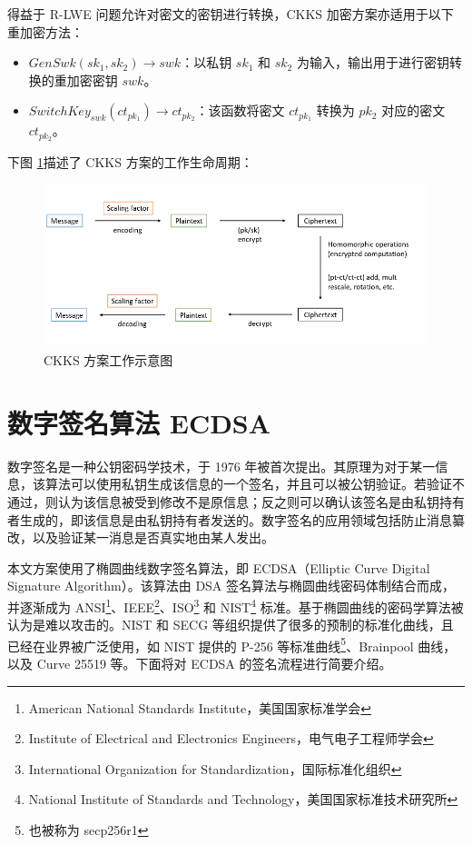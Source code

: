 得益于 R-LWE 问题允许对密文的密钥进行转换\cite{brakerski2014leveled}，CKKS 加密方案亦适用于以下重加密方法：

\begin{itemize}
    \item $GenSwk(sk_1, sk_2) \rightarrow swk$：以私钥 $sk_1$ 和 $sk_2$ 为输入，输出用于进行密钥转换的重加密密钥 $swk$。
    \item $SwitchKey_{swk}(ct_{pk_1}) \rightarrow ct_{pk_2}$：该函数将密文 $ct_{pk_1}$ 转换为 $pk_2$ 对应的密文 $ct_{pk_2}$。
\end{itemize}

下图\cite{ckksIntroduct} \ref*{Fig:CKKS}描述了 CKKS 方案的工作生命周期：

\begin{figure}[ht]
    \centering
    \includegraphics[width=\linewidth]{./Figures/CKKS_Diagram.png}
    \caption{CKKS 方案工作示意图}\label{Fig:CKKS}
\end{figure}

\section{数字签名算法 ECDSA} \label{sec:ecdsa}

数字签名是一种公钥密码学技术，于 1976 年被首次提出\cite{1055638}。其原理为对于某一信息，该算法可以使用私钥生成该信息的一个签名，并且可以被公钥验证。若验证不通过，则认为该信息被受到修改不是原信息；反之则可以确认该签名是由私钥持有者生成的，即该信息是由私钥持有者发送的。数字签名的应用领域包括防止消息纂改，以及验证某一消息是否真实地由某人发出。

本文方案使用了椭圆曲线数字签名算法，即 ECDSA（Elliptic Curve Digital Signature Algorithm）。该算法由 DSA 签名算法与椭圆曲线密码体制结合而成，并逐渐成为 ANSI\footnote{American National Standards Institute，美国国家标准学会}、IEEE\footnote{Institute of Electrical and Electronics Engineers，电气电子工程师学会}、ISO\footnote{International Organization for Standardization，国际标准化组织} 和 NIST\footnote{National Institute of Standards and Technology，美国国家标准技术研究所} 标准\cite{ecdsa_blockchain}。基于椭圆曲线的密码学算法被认为是难以攻击的。NIST 和 SECG 等组织提供了很多的预制的标准化曲线，且已经在业界被广泛使用，如 NIST 提供的 P-256 等标准曲线\footnote{也被称为 secp256r1}、Brainpool 曲线，以及 Curve 25519\cite{10.1007/11745853_14} 等。下面将对 ECDSA 的签名流程进行简要介绍。

